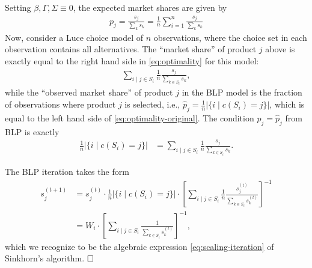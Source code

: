 Setting $\beta,\Gamma,\Sigma \equiv 0$, the expected market shares are given by 
\begin{align*}
p_{j} = \frac{s_{j}}{\sum_{k}s_{k}}= \frac{1}{n}\sum_{i=1}^n \frac{s_{j}}{\sum_{k}s_{k}}
\end{align*}
Now, consider a Luce choice model of $n$ observations, where the choice set in each observation contains all alternatives. The ``market share'' of product $j$ above is exactly equal to the right hand side in \eqref{eq:optimality} for this model: 
\begin{align*}
\sum_{i\mid j\in S_{i}}\frac{1}{n}\frac{s_{j}}{\sum_{k\in S_{i}}s_{k}},
\end{align*}
 while the ``observed market share'' of product $j$ in the BLP model is the fraction of observations where product $j$ is selected, i.e.,  $\hat{p}_{j}=\frac{1}{n}|\{i\mid c(S_{i})=j\}|$, which is equal to the left hand side of \eqref{eq:optimality-original}. The condition $p_{j}=\hat{p}_{j}$ from BLP is exactly 
\begin{align*}
\frac{1}{n}|\{i\mid c(S_{i})=j\}| & =\sum_{i\mid j\in S_{i}}\frac{1}{n}\frac{s_{j}}{\sum_{k\in S_{i}}s_{k}}.
\end{align*}

The BLP iteration takes the form 
\begin{align*}
 s_j^{(t+1)}& =s_{j}^{(t)}\cdot\frac{1}{n}|\{i\mid c(S_{i})=j\}|\cdot\left[\sum_{i\mid j\in S_{i}}\frac{1}{n}\frac{s_{j}^{(t)}}{\sum_{k\in S_{i}}s_{k}^{(t)}}\right]^{-1}\\
 & =W_{i}\cdot\left[\sum_{i\mid j\in S_{i}}\frac{1}{\sum_{k\in S_{i}}s_{k}^{(t)}}\right]^{-1},
\end{align*}
which we recognize to be the algebraic expression \eqref{eq:scaling-iteration} of Sinkhorn's algorithm.  $\hfill \square$
